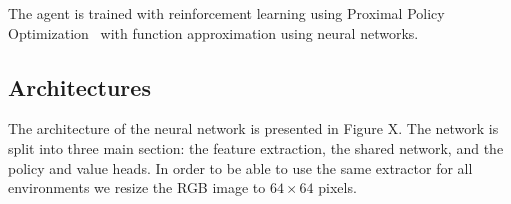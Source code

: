 The agent is trained with reinforcement learning using Proximal Policy Optimization~\cite{proxim} with function approximation using neural networks.







\subsection{Architectures}



The architecture of the neural network is presented in Figure X.
The network is split into three main section: the feature extraction, the shared network, and the policy and value heads.
In order to be able to use the same extractor for all environments we resize the RGB image to \(64 \times 64\) pixels.



